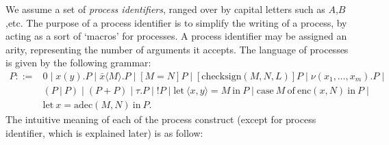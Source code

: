 \documentclass{article}
\begin{document}
We assume a set of {\em process identifiers}, ranged over by capital letters such
as $A$,$B$,etc. The purpose of a process identifier is to simplify the writing of a process,
by acting as a sort of `macros' for processes. 
A process identifier may be assigned an arity, representing the number of arguments it accepts. 
The language of processes is given by the following grammar:
$$
\begin{array}{ll}
P ::= & 0 \mid x(y).P \mid \bar x\langle M \rangle. P \mid [M = N] P \mid 
[\mathrm{checksign}(M, N, L)] P \mid 
        \nu (x_1,\ldots,x_m). P \mid \\
  & (P ~|~ P) \mid (P + P) \mid \tau.P \mid !P \mid 
 \mathrm{let}~ \langle x, y \rangle = M ~ \mathrm{ in } ~ P
 \mid
\mathrm{case} ~ M ~ \mathrm{ of } ~ \mathrm{enc}(x,N) ~ \mathrm{ in } ~ P \mid
\\
&
\mathrm{let} ~ x = \mathrm{adec}(M, N) ~ \mathrm{ in } ~ P
.
\end{array}
$$
The intuitive meaning of each of the process construct (except for process identifier, which
is explained later) is as follow:
\end{document}
